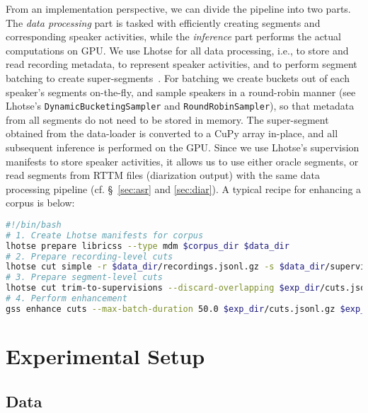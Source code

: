 \documentclass[a4paper]{article}
\begin{document}
From an implementation perspective, we can divide the pipeline into two parts. The \textit{data processing} part is tasked with efficiently creating segments and corresponding speaker activities, while the \textit{inference} part performs the actual computations on GPU. We use Lhotse for all data processing, i.e., to store and read recording metadata, to represent speaker activities, and to perform segment batching to create super-segments~\cite{zelasko2021LhotseAS}. For batching we create buckets out of each speaker's segments on-the-fly, and sample speakers in a round-robin manner (see Lhotse's \texttt{DynamicBucketingSampler} and \texttt{RoundRobinSampler}), so that metadata from all segments do not need to be stored in memory. The super-segment obtained from the data-loader is converted to a CuPy array in-place, and all subsequent inference is performed on the GPU. Since we use Lhotse's supervision manifests to store speaker activities, it allows us to use either oracle segments, or read segments from RTTM files (diarization output) with the same data processing pipeline (cf. \S~\ref{sec:asr} and \ref{sec:diar}). A typical recipe for enhancing a corpus is below:

\clearpage

\begin{lstlisting}[language=bash]
#!/bin/bash
# 1. Create Lhotse manifests for corpus
lhotse prepare libricss --type mdm $corpus_dir $data_dir
# 2. Prepare recording-level cuts
lhotse cut simple -r $data_dir/recordings.jsonl.gz -s $data_dir/supervisions.jsonl.gz $exp_dir/cuts.jsonl.gz
# 3. Prepare segment-level cuts
lhotse cut trim-to-supervisions --discard-overlapping $exp_dir/cuts.jsonl.gz $exp_dir/segments.jsonl.gz
# 4. Perform enhancement
gss enhance cuts --max-batch-duration 50.0 $exp_dir/cuts.jsonl.gz $exp_dir/segments.jsonl.gz $exp_dir/enhanced
\end{lstlisting}

\section{Experimental Setup}

\subsection{Data}
\end{document}
